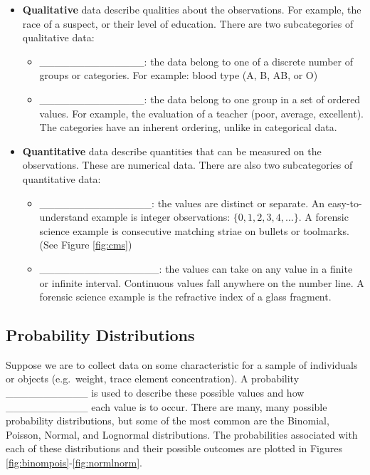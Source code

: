 \documentclass[]{book}
\providecommand{\tightlist}{%
  \setlength{\itemsep}{0pt}\setlength{\parskip}{0pt}}
\theoremstyle{definition}
\theoremstyle{definition}
\theoremstyle{remark}
\begin{document}
\begin{itemize}
\tightlist
\item
  \textbf{Qualitative} data describe qualities about the observations.
  For example, the race of a suspect, or their level of education. There
  are two subcategories of qualitative data: \vspace{.1in}

  \begin{itemize}
  \tightlist
  \item
    \_\_\_\_\_\_\_\_\_\_\_\_\_\_: the data belong to one of a discrete
    number of groups or categories. For example: blood type (A, B, AB,
    or O) \vspace{.1in}
  \item
    \_\_\_\_\_\_\_\_\_\_\_\_\_\_: the data belong to one group in a set
    of ordered values. For example, the evaluation of a teacher (poor,
    average, excellent). The categories have an inherent ordering,
    unlike in categorical data.\vspace{.1in}
  \end{itemize}
\item
  \textbf{Quantitative} data describe quantities that can be measured on
  the observations. These are numerical data. There are also two
  subcategories of quantitative data: \vspace{.1in}

  \begin{itemize}
  \tightlist
  \item
    \_\_\_\_\_\_\_\_\_\_\_\_\_\_\_: the values are distinct or separate.
    An easy-to-understand example is integer observations:
    \(\{0,1,2,3,4, \dots \}\). A forensic science example is consecutive
    matching striae on bullets or toolmarks. (See Figure \ref{fig:cms})
  \item
    \_\_\_\_\_\_\_\_\_\_\_\_\_\_\_\_: the values can take on any value
    in a finite or infinite interval. Continuous values fall anywhere on
    the number line. A forensic science example is the refractive index
    of a glass fragment.
  \end{itemize}
\end{itemize}

\subsection{Probability Distributions}\label{probability-distributions}

Suppose we are to collect data on some characteristic for a sample of
individuals or objects (e.g.~weight, trace element concentration). A
probability \_\_\_\_\_\_\_\_\_\_\_ is used to describe these possible
values and how \_\_\_\_\_\_\_\_\_\_\_ each value is to occur. There are
many, many possible probability distributions, but some of the most
common are the Binomial, Poisson, Normal, and Lognormal distributions.
The probabilities associated with each of these distributions and their
possible outcomes are plotted in Figures
\ref{fig:binompois}-\ref{fig:normlnorm}.
\end{document}
